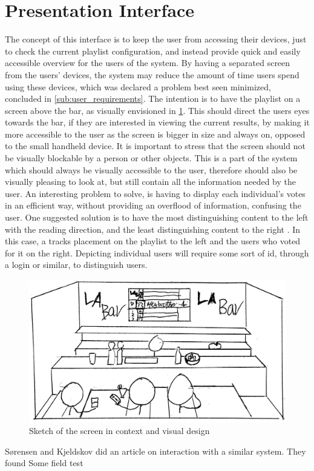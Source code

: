 \section{Presentation Interface}

The concept of this interface is to keep the user from accessing their devices, just to check the current playlist configuration, and instead provide quick and easily accessible overview for the users of the system. By having a separated screen from the users' devices, the system may reduce the amount of time users spend using these devices, which was declared a problem best seen minimized, concluded in \cref{sub:user_requirements}. The intention is to have the playlist on a screen above the bar, as visually envisioned in \cref{fig:PresentationInterface}. This should direct the users eyes towards the bar, if they are interested in viewing the current results, by making it more accessible to the user as the screen is bigger in size and always on, opposed to the small handheld device\cite{DEB}. It is important to stress that the screen should not be visually blockable by a person or other objects.
This is a part of the system which should always be visually accessible to the user, therefore should also be visually pleasing to look at, but still contain all the information needed by the user. An interesting problem to solve, is having to display each individual's votes in an efficient way, without providing an overflood of information, confusing the user. One suggested solution is to have the most distinguishing content to the left with the reading direction, and the least distinguishing content to the right \cite{material}. In this case, a tracks placement on the playlist to the left and the users who voted for it on the right. Depicting individual users will require some sort of id, through a login or similar, to distinguish users.

\begin{figure}[hbtp]
  \centering
  \includegraphics[width=1.0\linewidth]{Images/presentation.png}
  \caption{Sketch of the screen in context and visual design}\label{fig:PresentationInterface}
\end{figure}


Sørensen and Kjeldskov did an article on interaction with a similar system. They found
Some field test 